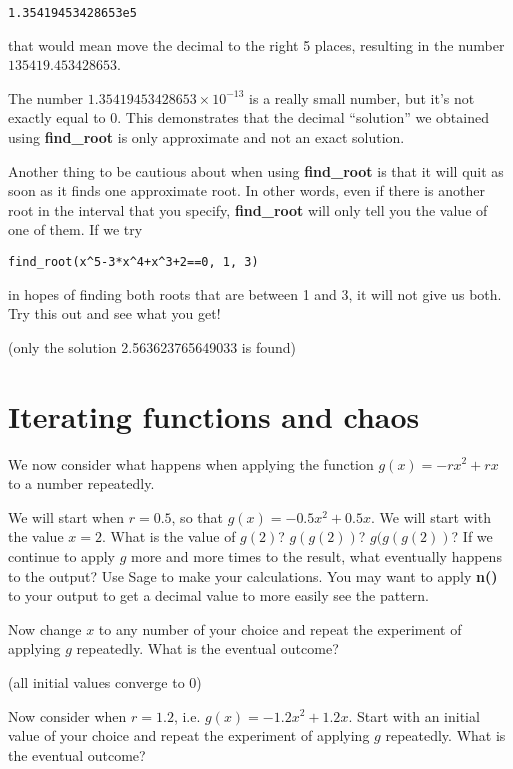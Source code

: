\begin{verbatim}1.35419453428653e5\end{verbatim}

that would mean move the decimal to the right 5 places, resulting
in the number $135419.453428653$.

The number $1.35419453428653\times 10^{-13}$ is a really
small number, but it's not exactly equal to 0. This 
demonstrates that the decimal ``solution'' we obtained using
\textbf{find\_root} is only approximate and not an exact solution.

Another thing to be cautious about when using \textbf{find\_root}
is that it will quit as soon as it finds one approximate root. In other
words, even if there is another root in the interval that you specify,
\textbf{find\_root} will only tell you the value of one of them. If we
try

\begin{verbatim}
find_root(x^5-3*x^4+x^3+2==0, 1, 3)
\end{verbatim}

in hopes of finding both roots that are between 1 and 3, it will not
give us both. Try this out and see what you get!

(only the solution 2.563623765649033 is found)

\section{Iterating functions and chaos}

We now consider what happens when applying the function $g(x)=-rx^2+rx$
to a number repeatedly.

We will start when $r=0.5$, so that $g(x)=-0.5x^2+0.5x$. We will start with
the value $x=2$. What is the value of $g(2)$? $g(g(2))$? $g(g(g(2))$?
If we continue to apply $g$ more and more times to the result, what eventually
happens to the output? Use Sage to make your calculations. You may want to
apply \textbf{n()} to your output to get a decimal value to more easily
see the pattern.

Now change $x$ to any number of your choice and repeat the experiment of
applying $g$ repeatedly. What is the eventual outcome?

(all initial values converge to $0$)

Now consider when $r=1.2$, i.e. $g(x)=-1.2x^2+1.2x$.
Start with an initial value of your choice and repeat
the experiment of applying $g$ repeatedly. What is the eventual outcome?

